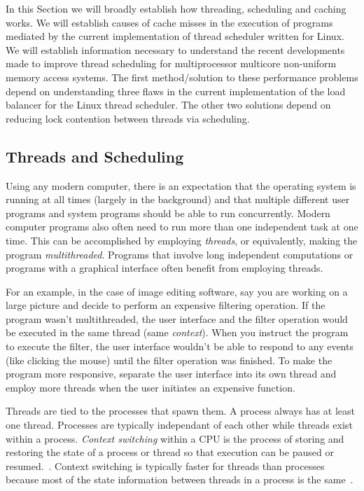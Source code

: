 \documentclass{sig-alternate}
\begin{document}
In this Section we will broadly establish how threading, scheduling and caching works. We will establish causes of cache misses in the execution of programs mediated by the current implementation of thread scheduler written for Linux. We will establish information necessary to understand the recent developments made to improve thread scheduling for multiprocessor multicore non-uniform memory access systems. The first method/solution to these performance problems depend on understanding three flaws in the current implementation of the load balancer for the Linux thread scheduler. The other two solutions depend on reducing lock contention between threads via scheduling.

\subsection{Threads and Scheduling}
\label{sec:threads}
Using any modern computer, there is an expectation that the operating system is running at all times (largely in the background) and that multiple different user programs and system programs should be able to run concurrently. Modern computer programs also often need to run more than one independent task at one time. This can be accomplished by employing \emph{threads}, or equivalently, making the program \emph{multithreaded}. Programs that involve long independent computations or programs with a graphical interface often benefit from employing threads.

For an example, in the case of image editing software, say you are working on a large picture and decide to perform an expensive filtering operation. If the program wasn't multithreaded, the user interface and the filter operation would be executed in the same thread (same \emph{context}). When you instruct the program to execute the filter, the user interface wouldn't be able to respond to any events (like clicking the mouse) until the filter operation was finished. To make the program more responsive, separate the user interface into its own thread and employ more threads when the user initiates an expensive function.
	
Threads are tied to the processes that spawn them. A process always has at least one thread. Processes are typically independant of each other while threads exist within a process. \emph{Context switching} within a CPU is the process of storing and restoring the state of a process or thread so that execution can be paused or resumed.~\cite{WikiContext}. Context switching is typically faster for threads than processes because most of the state information between threads in a process is the same~\cite{WikiThreads}. 
\end{document}
